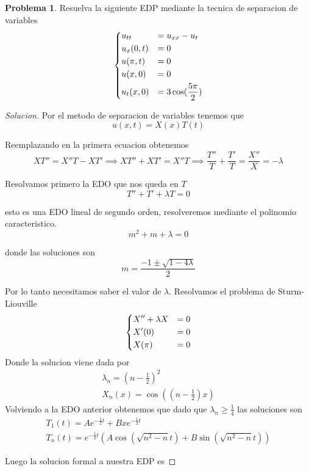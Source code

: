 \documentclass{article}
\theoremstyle{definition}
\newtheorem{problem}{Problema}
\newenvironment{solution}{\begin{proof}[Solucion]}{\end{proof}}
\begin{document}
\begin{problem}
  Resuelva la siguiente EDP mediante la tecnica de separacion de variables
  \begin{equation*}
  \begin{dcases}
    u_{tt} &= u_{xx} - u_t\\
    u_x(0, t) &= 0\\
    u(\pi, t) &= 0\\
    u(x, 0) &= 0\\
    u_t(x, 0) &= 3 \cos(\frac{5\pi}{2})
  \end{dcases}
  \end{equation*}
\end{problem}
\begin{solution}
  Por el metodo de separacion de variables tenemos que
  \begin{equation*}
    u(x, t) = X(x)T(t)
  \end{equation*}

  Reemplazando en la primera ecuacion obtenemos
  \begin{equation*}
    XT'' = X''T - XT' \implies XT'' + XT' = X''T \implies \frac{T''}{T} + \frac{T'}{T} = \frac{X''}{X} = -\lambda
  \end{equation*}

  Resolvamos primero la EDO que nos queda en $T$
  \begin{equation*}
    T'' + T' + \lambda T = 0
  \end{equation*}

  esto es una EDO lineal de segundo orden, resolveremos mediante el polinomio caracteristico.
  \begin{equation*}
    m^{2} + m + \lambda = 0
  \end{equation*}

  donde las soluciones son
  \begin{equation*}
    m = \frac{-1 \pm \sqrt{1 - 4\lambda}}{2}
  \end{equation*}

  Por lo tanto necesitamos saber el valor de $\lambda$. Resolvamos el problema de Sturm-Liouville
  \begin{equation*}
    \begin{dcases}
      X'' + \lambda X &= 0\\
      X'(0) &= 0\\
      X(\pi) &= 0
    \end{dcases}
  \end{equation*}
  Donde la solucion viene dada por
  \begin{gather*}
    \lambda_{n} = (n - \frac12)^{2}\\
    X_{n}(x) = \cos((n - \frac12)x)
  \end{gather*}
  Volviendo a la EDO anterior obtenemos que dado que $\lambda_{n} \geq \frac{1}{4}$ las soluciones son
  \begin{gather*}
    T_{1}(t) = Ae^{-\frac12 t} + Bxe^{-\frac12 t}\\
    T_{n}(t) = e^{-\frac12 t}(A \cos(\sqrt{n^{2} - n} t) + B \sin(\sqrt{n^{2} - n}t))
  \end{gather*}

  Luego la solucion formal a nuestra EDP es
\end{solution}
\end{document}
